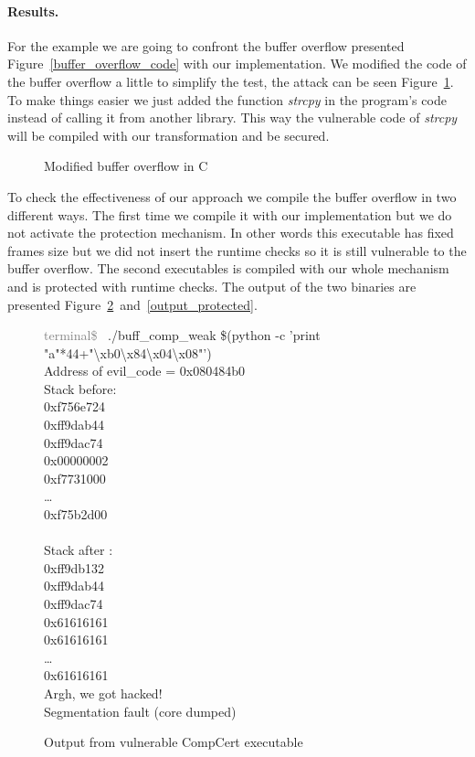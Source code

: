 \documentclass[11pt]{sdm}
\begin{document}
\paragraph{Results.}
\label{par:Results}
For the example we are going to confront the buffer overflow presented Figure~\ref{buffer_overflow_code} with our implementation. We modified the code of the buffer overflow a little to simplify the test, the attack can be seen Figure~\ref{buffer_2}. To make things easier we just added the function \textit{strcpy} in the program's code instead of calling it from another library. This way the vulnerable code of \textit{strcpy} will be compiled with our transformation and be secured.

\begin{figure}[!ht]

\centering
\caption{Modified buffer overflow in C}
\label{buffer_2}
\end{figure}

To check the effectiveness of our approach we compile the buffer overflow in two different ways.
The first time we compile it with our implementation but we do not activate the protection mechanism. In other words this executable has fixed frames size but we did not insert the runtime checks so it is still vulnerable to the buffer overflow. The second executables is compiled with our whole mechanism and is protected with runtime checks.
The output of the two binaries are presented Figure~\ref{output_weak}~and~\ref{output_protected}. 

\begin{figure}[!ht]
\textcolor{gray}{terminal\$~} ./buff\_comp\_weak \$(python -c 'print "a"*44+"\textbackslash{xb0}\textbackslash{x84}\textbackslash{x04}\textbackslash{x08}"')\\
Address of evil\_code = 0x080484b0 \\

Stack before:\\
0xf756e724   \\
0xff9dab44   \\
0xff9dac74   \\
0x00000002   \\
0xf7731000   \\
\dots\\
0xf75b2d00   \\
             \\
Stack after :\\
0xff9db132   \\
0xff9dab44   \\
0xff9dac74   \\
0x61616161   \\
0x61616161   \\
\dots   \\
0x61616161   \\

Argh, we got hacked!\\
Segmentation fault (core dumped)
\caption{Output from vulnerable CompCert executable}
\label{output_weak}
\end{figure}
\end{document}
